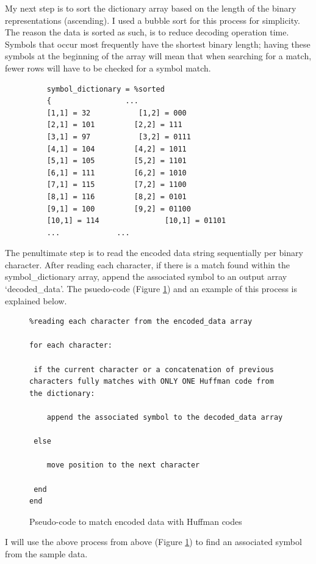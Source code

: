 \documentclass[12pt]{article}
\begin{document}
My next step is to sort the dictionary array based on the length of the binary representations (ascending). I used a bubble sort for this process for simplicity. The reason the data is sorted as such, is to reduce decoding operation time. Symbols that occur most frequently have the shortest binary length; having these symbols at the beginning of the array will mean that when searching for a match, fewer rows will have to be checked for a symbol match.

\begin{figure}[H]
	\begin{verbatim}
	symbol_dictionary = %sorted
	{				  ...
	[1,1] = 32			 [1,2] = 000
	[2,1] = 101			[2,2] = 111
	[3,1] = 97			 [3,2] = 0111
	[4,1] = 104			[4,2] = 1011
	[5,1] = 105			[5,2] = 1101
	[6,1] = 111			[6,2] = 1010
	[7,1] = 115			[7,2] = 1100
	[8,1] = 116			[8,2] = 0101
	[9,1] = 100			[9,2] = 01100
	[10,1] = 114		       [10,1] = 01101
	...				...
	\end{verbatim} 
\end{figure}

The penultimate step is to read the encoded data string sequentially per binary character. After reading each character, if there is a match found within the symbol\_dictionary array, append the associated symbol to an output array `decoded\_data'. The psuedo-code (Figure \ref{huff_codes2syms_psuedo}) and an example of this process is explained below.

\begin{figure}[H]
\begin{verbatim}
%reading each character from the encoded_data array

for each character:

 if the current character or a concatenation of previous characters fully matches with ONLY ONE Huffman code from the dictionary:
 
 	append the associated symbol to the decoded_data array
  
 else
 
 	move position to the next character
  
 end
end	
\end{verbatim}
\caption{Pseudo-code to match encoded data with Huffman codes}
\label{huff_codes2syms_psuedo}
\end{figure}

I will use the above process from above (Figure \ref{huff_codes2syms_psuedo}) to find an associated symbol from the sample data.
\end{document}
